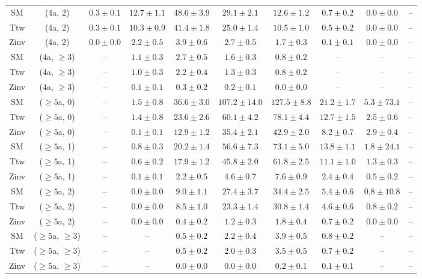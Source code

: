 \begin{table}[h!]
{\begin{tabular}{cccccccccc}
	SM & (4a, 2) & $0.3\pm 0.1$ & $12.7\pm 1.1$ & $48.6\pm 3.9$ & $29.1\pm 2.1$ & $12.6\pm 1.2$ & $0.7\pm 0.2$ & $0.0\pm 0.0$ & -- \\[0.5ex] 
	Ttw & (4a, 2) & $0.3\pm 0.1$ & $10.3\pm 0.9$ & $41.4\pm 1.8$ & $25.0\pm 1.4$ & $10.5\pm 1.0$ & $0.5\pm 0.2$ & $0.0\pm 0.0$ & -- \\[0.5ex] 
	Zinv & (4a, 2) & $0.0\pm 0.0$ & $2.2\pm 0.5$ & $3.9\pm 0.6$ & $2.7\pm 0.5$ & $1.7\pm 0.3$ & $0.1\pm 0.1$ & $0.0\pm 0.0$ & -- \\[0.5ex] 
	SM & (4a, $\ge3$) & -- & $1.1\pm 0.3$ & $2.7\pm 0.5$ & $1.6\pm 0.3$ & $0.8\pm 0.2$ & -- & -- & -- \\[0.5ex] 
	Ttw & (4a, $\ge3$) & -- & $1.0\pm 0.3$ & $2.2\pm 0.4$ & $1.3\pm 0.3$ & $0.8\pm 0.2$ & -- & -- & -- \\[0.5ex] 
	Zinv & (4a, $\ge3$) & -- & $0.1\pm 0.1$ & $0.3\pm 0.2$ & $0.2\pm 0.1$ & $0.0\pm 0.0$ & -- & -- & -- \\[0.5ex] 
	SM & ($\ge5$a, 0) & -- & $1.5\pm 0.8$ & $36.6\pm 3.0$ & $107.2\pm 14.0$ & $127.5\pm 8.8$ & $21.2\pm 1.7$ & $5.3\pm 73.1$ & -- \\[0.5ex] 
	Ttw & ($\ge5$a, 0) & -- & $1.4\pm 0.8$ & $23.6\pm 2.6$ & $60.1\pm 4.2$ & $78.1\pm 4.4$ & $12.7\pm 1.5$ & $2.5\pm 0.6$ & -- \\[0.5ex] 
	Zinv & ($\ge5$a, 0) & -- & $0.1\pm 0.1$ & $12.9\pm 1.2$ & $35.4\pm 2.1$ & $42.9\pm 2.0$ & $8.2\pm 0.7$ & $2.9\pm 0.4$ & -- \\[0.5ex] 
	SM & ($\ge5$a, 1) & -- & $0.8\pm 0.3$ & $20.2\pm 1.4$ & $56.6\pm 7.3$ & $73.1\pm 5.0$ & $13.8\pm 1.1$ & $1.8\pm 24.1$ & -- \\[0.5ex] 
	Ttw & ($\ge5$a, 1) & -- & $0.6\pm 0.2$ & $17.9\pm 1.2$ & $45.8\pm 2.0$ & $61.8\pm 2.5$ & $11.1\pm 1.0$ & $1.3\pm 0.3$ & -- \\[0.5ex] 
	Zinv & ($\ge5$a, 1) & -- & $0.1\pm 0.1$ & $2.2\pm 0.5$ & $4.6\pm 0.7$ & $7.6\pm 0.9$ & $2.4\pm 0.4$ & $0.5\pm 0.2$ & -- \\[0.5ex] 
	SM & ($\ge5$a, 2) & -- & $0.0\pm 0.0$ & $9.0\pm 1.1$ & $27.4\pm 3.7$ & $34.4\pm 2.5$ & $5.4\pm 0.6$ & $0.8\pm 10.8$ & -- \\[0.5ex] 
	Ttw & ($\ge5$a, 2) & -- & $0.0\pm 0.0$ & $8.5\pm 1.0$ & $23.3\pm 1.4$ & $30.8\pm 1.4$ & $4.6\pm 0.6$ & $0.8\pm 0.2$ & -- \\[0.5ex] 
	Zinv & ($\ge5$a, 2) & -- & $0.0\pm 0.0$ & $0.4\pm 0.2$ & $1.2\pm 0.3$ & $1.8\pm 0.4$ & $0.7\pm 0.2$ & $0.0\pm 0.0$ & -- \\[0.5ex] 
	SM & ($\ge5$a, $\ge3$) & -- & -- & $0.5\pm 0.2$ & $2.2\pm 0.4$ & $3.9\pm 0.5$ & $0.8\pm 0.2$ & -- & -- \\[0.5ex] 
	Ttw & ($\ge5$a, $\ge3$) & -- & -- & $0.5\pm 0.2$ & $2.0\pm 0.3$ & $3.5\pm 0.5$ & $0.7\pm 0.2$ & -- & -- \\[0.5ex] 
	Zinv & ($\ge5$a, $\ge3$) & -- & -- & $0.0\pm 0.0$ & $0.0\pm 0.0$ & $0.2\pm 0.1$ & $0.1\pm 0.1$ & -- & -- \\[0.5ex] 
	\hline
	\hline
\end{tabular}}
\end{table}
